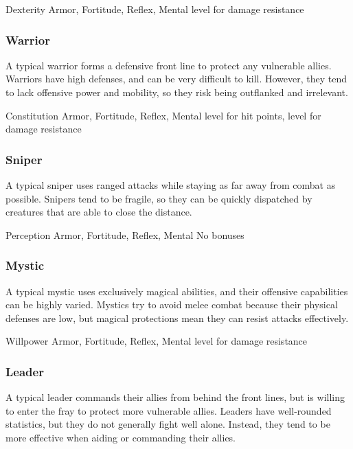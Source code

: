               Dexterity
              Armor,  Fortitude,  Reflex,  Mental
              level for damage resistance

        \subsubsection{Warrior}
            A typical warrior forms a defensive front line to protect any vulnerable allies.
            Warriors have high defenses, and can be very difficult to kill.
            However, they tend to lack offensive power and mobility, so they risk being outflanked and irrelevant.

              Constitution
              Armor,  Fortitude,  Reflex,  Mental
              level for hit points,  level for damage resistance

        \subsubsection{Sniper}
            A typical sniper uses ranged attacks while staying as far away from combat as possible.
            Snipers tend to be fragile, so they can be quickly dispatched by creatures that are able to close the distance.

              Perception
              Armor,  Fortitude,  Reflex,  Mental
             No bonuses

        \subsubsection{Mystic}
            A typical mystic uses exclusively magical abilities, and their offensive capabilities can be highly varied.
            Mystics try to avoid melee combat because their physical defenses are low, but magical protections mean they can resist attacks effectively.

              Willpower
              Armor,  Fortitude,  Reflex,  Mental
              level for damage resistance

        \subsubsection{Leader}
            A typical leader commands their allies from behind the front lines, but is willing to enter the fray to protect more vulnerable allies.
            Leaders have well-rounded statistics, but they do not generally fight well alone.
            Instead, they tend to be more effective when aiding or commanding their allies.

